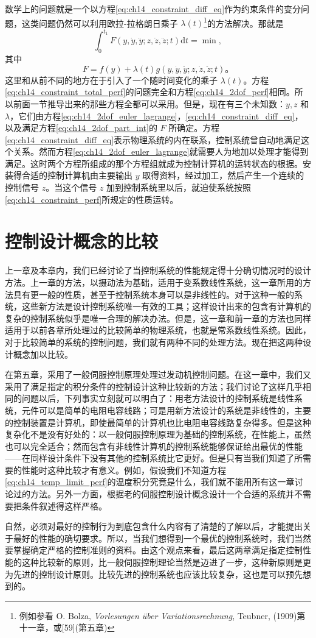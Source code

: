 数学上的问题就是一个以方程\eqref{eq:ch14_constraint_diff_eq}作为约束条件的变分问题，这类问题仍然可以利用欧拉-拉格朗日乘子 $\lambda(t)$\footnote{例如参看 O. Bolza, \textit{Vorlesungen über Variationsrechnung}, Teubner, (1909)第十一章，或[59](第五章)}的方法解决。那就是
\begin{equation}
\int_{0}^{t_1} F(y,\dot{y},\ddot{y};z,\dot{z},\ddot{z};t)\mathrm{d}t = \min,
\label{eq:ch14_constraint_total_perf}
\end{equation}
其中
\begin{equation}
F = f(y)+\lambda(t)g(y,\dot{y},\ddot{y};z,\dot{z},\ddot{z};t)。
\label{eq:ch14_constraint_F_def}
\end{equation}
这里和从前不同的地方在于引入了一个随时间变化的乘子 $\lambda(t)$。方程\eqref{eq:ch14_constraint_total_perf}的问题完全和方程\eqref{eq:ch14_2dof_perf}相同。所以前面一节推导出来的那些方程全都可以采用。但是，现在有三个未知数：$y,z$ 和 $\lambda$，它们由方程\eqref{eq:ch14_2dof_euler_lagrange}，\eqref{eq:ch14_constraint_diff_eq}，以及满足方程\eqref{eq:ch14_2dof_part_int}的 $F$ 所确定。方程\eqref{eq:ch14_constraint_diff_eq}表示物理系统的内在联系，控制系统曾自动地满足这个关系。然而方程\eqref{eq:ch14_2dof_euler_lagrange}就需要人为地加以处理才能得到满足。这时两个方程所组成的那个方程组就成为控制计算机的运转状态的根据。安装得合适的控制计算机由主要输出 $y$ 取得资料，经过加工，然后产生一个连续的控制信号 $z$。当这个信号 $z$ 加到控制系统里以后，就迫使系统按照\eqref{eq:ch14_constraint_perf}所规定的性质运转。

\section{控制设计概念的比较}
上一章及本章内，我们已经讨论了当控制系统的性能规定得十分确切情况时的设计方法。上一章的方法，以摄动法为基础，适用于变系数线性系统，这一章所用的方法具有更一般的性质，甚至于控制系统本身可以是非线性的。对于这种一般的系统，这些新方法是设计控制系统唯一有效的工具；这样设计出来的包含有计算机的复杂的控制系统似乎是唯一合理的解决办法。但是，这一章和前一章的方法也同样适用于以前各章所处理过的比较简单的物理系统，也就是常系数线性系统。因此，对于比较简单的系统的控制问题，我们就有两种不同的处理方法。现在把这两种设计概念加以比较。

在第五章，采用了一般伺服控制原理处理过发动机控制问题。在这一章中，我们又采用了满足指定的积分条件的控制设计这种比较新的方法；我们讨论了这样几乎相同的问题以后，下列事实立刻就可以明白了：用老方法设计的控制系统是线性系统，元件可以是简单的电阻电容线路；可是用新方法设计的系统是非线性的，主要的控制装置是计算机，即使最简单的计算机也比电阻电容线路复杂得多。但是这种复杂化不是没有好处的：以一般伺服控制原理为基础的控制系统，在性能上，虽然也可以完全适合；然而包含有非线性计算机的控制系统能够保证给出最优的性能——在同样设计条件下没有其他的控制系统比它更好。但是只有当我们知道了所需要的性能时这种比较才有意义。例如，假设我们不知道方程\eqref{eq:ch14_temp_limit_perf}的温度积分究竟是什么，我们就不能用所有这一章讨论过的方法。另外一方面，根据老的伺服控制设计概念设计一个合适的系统并不需要把条件叙述得这样严格。

自然，必须对最好的控制行为到底包含什么内容有了清楚的了解以后，才能提出关于最好的性能的确切要求。所以，当我们想得到一个最优的控制系统时，我们当然要掌握确定严格的控制准则的资料。由这个观点来看，最后这两章满足指定控制性能的这种比较新的原则，比一般伺服控制理论当然是迈进了一步，这种新原则是更为先进的控制设计原则。比较先进的控制系统也应该比较复杂，这也是可以预先想到的。

